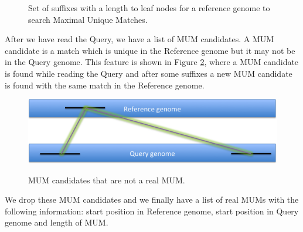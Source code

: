 \documentclass[runningheads,a4paper]{llncs}
\begin{document}
{\begin{figure}
\label{fig:algo}
\caption{Set of suffixes with a length to leaf nodes for a reference genome to search Maximal Unique Matches.}
\end{figure}
After we have read the Query, we have a list of MUM candidates. A MUM candidate is a match which is unique in the Reference genome but it may not be in the Query genome. This feature is shown in Figure \ref{fig:mumcand}, where a MUM candidate is found while reading the Query and after some suffixes a new MUM candidate is found with the same match in the Reference genome.
\begin{figure}
\centering
\includegraphics[scale=0.5]{Whole-MUM.png}
\label{fig:mumcand}
\caption{MUM candidates that are not a real MUM.}
\end{figure}
We drop these MUM candidates and we finally have a list of real MUMs with the following information: start position in Reference genome, start position in Query genome and length of MUM.
}
\end{document}
